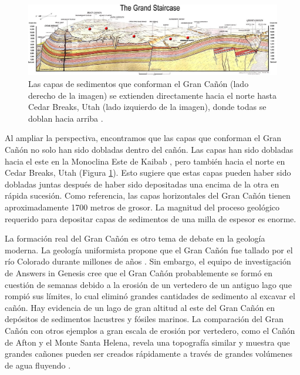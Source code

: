 \documentclass[10pt,twocolumn,letterpaper]{article}
\begin{document}
\begin{figure}
\begin{center}
\includegraphics[width=1\textwidth]{Grand_Staircase-big.jpg}
\end{center}
   \caption{Las capas de sedimentos que conforman el Gran Cañón (lado derecho de la imagen) se extienden directamente hacia el norte hasta Cedar Breaks, Utah (lado izquierdo de la imagen), donde todas se doblan hacia arriba \cite{50}.}
\label{fig:4}
\end{figure}

Al ampliar la perspectiva, encontramos que las capas que conforman el Gran Cañón no solo han sido dobladas dentro del cañón. Las capas han sido dobladas hacia el este en la Monoclina Este de Kaibab \cite{46}, pero también hacia el norte en Cedar Breaks, Utah (Figura \ref{fig:4}). Esto sugiere que estas capas pueden haber sido dobladas juntas después de haber sido depositadas una encima de la otra en rápida sucesión. Como referencia, las capas horizontales del Gran Cañón tienen aproximadamente 1700 metros de grosor. La magnitud del proceso geológico requerido para depositar capas de sedimentos de una milla de espesor es enorme.

La formación real del Gran Cañón es otro tema de debate en la geología moderna. La geología uniformista propone que el Gran Cañón fue tallado por el río Colorado durante millones de años \cite{47}. Sin embargo, el equipo de investigación de Answers in Genesis cree que el Gran Cañón probablemente se formó en cuestión de semanas debido a la erosión de un vertedero de un antiguo lago que rompió sus límites, lo cual eliminó grandes cantidades de sedimento al excavar el cañón. Hay evidencia de un lago de gran altitud al este del Gran Cañón en depósitos de sedimentos lacustres y fósiles marinos. La comparación del Gran Cañón con otros ejemplos a gran escala de erosión por vertedero, como el Cañón de Afton y el Monte Santa Helena, revela una topografía similar y muestra que grandes cañones pueden ser creados rápidamente a través de grandes volúmenes de agua fluyendo \cite{48}.
\end{document}

